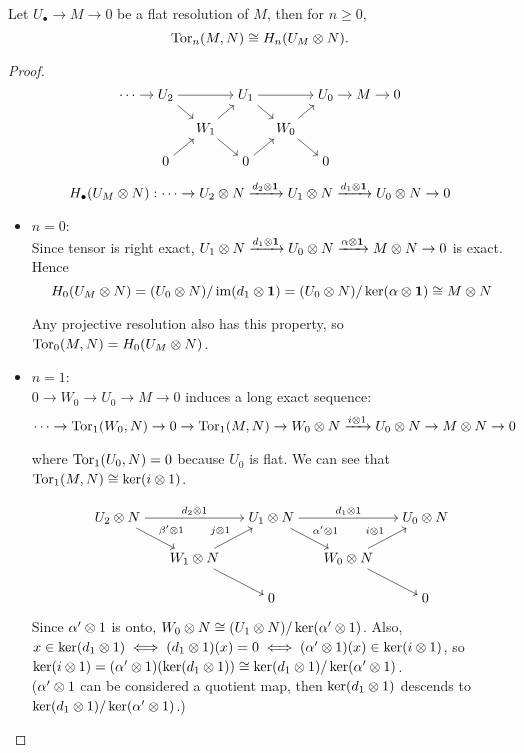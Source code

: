 \begin{theorem}
  Let $U_\bullet \to M \to 0$ be a flat resolution of $M$, then for $n \ge 0$,
  $$\operatorname{Tor}_n(M, N) \cong H_n(U_M \otimes N).$$
  \begin{proof}
    $$
      \begin{tikzcd}[cramped, sep=10pt]
        \cdots \ar[r] & U_2 \ar[rr] \ar[rd] && U_1 \ar[rr] \ar[rd] && U_0 \ar[r] & M \ar[r] & 0 \\
                      && W_1 \ar[ru] \ar[rd] && W_0 \ar[ru] \ar[rd] \\
                      & 0 \ar[ru] && 0 \ar[ru] && 0
      \end{tikzcd}
    $$

    $$H_\bullet(U_M \otimes N) : \cdots \to U_2 \otimes N \xrightarrow{d_2 \otimes \mathbf{1}} 
    U_1 \otimes N \xrightarrow{d_1 \otimes \mathbf{1}} U_0 \otimes N \to 0$$

    \begin{itemize}
      \item $n=0$: \\ 
        Since tensor is right exact, 
        $U_1 \otimes N \xrightarrow{d_1 \otimes \mathbf{1}} U_0 \otimes N \xrightarrow{\alpha \otimes \mathbf{1}} M \otimes N \to 0$
        is exact.
        Hence
        $$H_0(U_M \otimes N) = (U_0 \otimes N) / \operatorname{im}(d_1 \otimes \mathbf{1}) = (U_0 \otimes N) / \ker(\alpha \otimes \mathbf{1})
        \cong M \otimes N$$

        Any projective resolution also has this property, so $\operatorname{Tor}_0(M, N) = H_0(U_M \otimes N)$.

      \item $n=1$: \\
        $0 \to W_0 \to U_0 \to M \to 0$ induces a long exact sequence:
        $$\cdots \to \operatorname{Tor}_1(W_0, N) \to 0 \to \operatorname{Tor}_1(M, N) 
        \to W_0 \otimes N \xrightarrow{i \otimes 1} U_0 \otimes N \to M \otimes N \to 0$$

        where $\operatorname{Tor}_1(U_0, N) = 0$ because $U_0$ is flat.
        We can see that $\operatorname{Tor}_1(M, N) \cong \ker(i \otimes 1)$.

    $$
      \begin{tikzcd}[cramped, sep=15pt]
        U_2 \Ot N \ar[rr, "d_2 \Ot 1"] \ar[rd, "\beta' \Ot 1"] && 
        U_1 \Ot N \ar[rr, "d_1 \Ot 1"] \ar[rd, "\alpha' \Ot 1"] 
        && U_0 \Ot N\\
        & W_1 \Ot N\ar[ru, "j \Ot 1"] \ar[rd] && 
        W_0 \Ot N \ar[ru, "i \Ot 1"] \ar[rd] \\
        && 0 && 0
      \end{tikzcd}
    $$

    Since $\alpha' \otimes 1$ is onto, $W_0 \otimes N \cong (U_1 \otimes N) / \ker (\alpha' \otimes 1)$.
    Also, $x \in \ker(d_1 \otimes 1) \iff (d_1 \otimes 1)(x) = 0 \iff (\alpha' \otimes 1)(x) \in \ker (i \otimes 1)$,
    so $\ker (i \otimes 1) = (\alpha' \otimes 1)( \ker (d_1 \otimes 1)) \cong \ker (d_1 \otimes 1) / \ker(\alpha' \otimes 1)$. \\
    ($\alpha' \otimes 1$ can be considered a quotient map, then 
    $\ker (d_1 \otimes 1)$ descends to $\ker (d_1 \otimes 1) / \ker (\alpha' \otimes 1)$.)


\end{itemize}
\end{proof}
\end{theorem}
